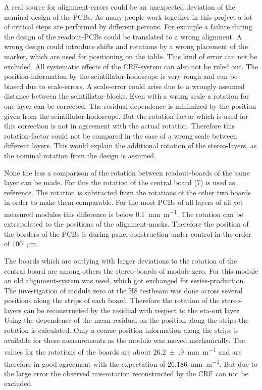 \documentclass[
twoside,            %
BCOR1.4cm,          %
10pt,               %
headings=normal,    %
headsepline,        %
clearplainpage,		%
final,              %
div=14,
open=right,
bibliography=toc
]{scrreprt}
\begin{document}
A real source for alignment-errors could be an unexpected deviation of the nominal design of the PCBs.
As many people work together in this project a lot of critical steps are performed by different persons. 
For example a failure during the design of the readout-PCBs could be translated to a wrong alignment.
A wrong design could introduce shifts and rotations by a wrong placement of the marker, which are used for positioning on the table.
This kind of error can not be excluded.
All systematic effects of the CRF-system can also not be ruled out.
The position-information by the scintillator-hodoscope is very rough and can be biased due to scale-errors.
A scale-error could arise due to a wrongly assumed distance between the scintillator-blocks.
Even with a wrong scale a rotation for one layer can be corrected.
The residual-dependence is minimized by the position given from the scintillator-hodoscope.
But the rotation-factor which is used for this correction is not in agreement with the actual rotation.
Therefore this rotation-factor could not be compared in the case of a wrong scale between different layers.
This would explain the additional rotation of the stereo-layers, as the nominal rotation from the design is assumed.

None the less a comparison of the rotation between readout-boards of the same layer can be made.
For this the rotation of the central board (7) is used as reference.
The rotation is subtracted from the rotations of the other two boards in order to make them comparable.
For the most PCBs of all layers of all yet measured modules this difference is below \SI{0.1}{\mm\per\m}.
The rotation can be extrapolated to the positions of the alignment-masks.
Therefore the position of the borders of the PCBs is during panel-construction under control in the order of \SI{100}{\micro\m}.

The boards which are outlying with larger deviations to the rotation of the central board are among others the stereo-boards of module zero.
For this module an old alignment-system was used, which got exchanged for series-production.
The investigation of module zero at the H8 testbeam was done across several positions along the strips of each board.
Therefore the rotation of the stereo-layers can be reconstructed by the residual with respect to the eta-out layer.
Using the dependence of the mean-residual on the position along the strips the rotation is calculated.
Only a coarse position information along the strips is available for these measurements as the module was moved mechanically.
The values for the rotations of the boards are about \SI{26.2(9)}{\mm\per\m} and are therefore in good agreement with the expectation of \SI{26.186}{\mm\per\m}.
But due to the large error the observed mis-rotation reconstructed by the CRF can not be excluded.
\end{document}
